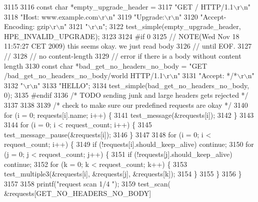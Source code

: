 \begin{DoxyCode}
{{{3115 
3116   \textcolor{keyword}{const} \textcolor{keywordtype}{char} *empty\_upgrade\_header =
3117     \textcolor{stringliteral}{"GET / HTTP/1.1\(\backslash\)r\(\backslash\)n"}
3118     \textcolor{stringliteral}{"Host: www.example.com\(\backslash\)r\(\backslash\)n"}
3119     \textcolor{stringliteral}{"Upgrade:\(\backslash\)r\(\backslash\)n"}
3120     \textcolor{stringliteral}{"Accept-Encoding: gzip\(\backslash\)r\(\backslash\)n"}
3121     \textcolor{stringliteral}{"\(\backslash\)r\(\backslash\)n"};
3122   test_simple(empty\_upgrade\_header, HPE_INVALID_UPGRADE);
3123 
3124 \textcolor{preprocessor}{  #if 0}
3125   \textcolor{comment}{// NOTE(Wed Nov 18 11:57:27 CET 2009) this seems okay. we just read body}
3126   \textcolor{comment}{// until EOF.}
3127   \textcolor{comment}{//}
3128   \textcolor{comment}{// no content-length}
3129   \textcolor{comment}{// error if there is a body without content length}
3130   \textcolor{keyword}{const} \textcolor{keywordtype}{char} *bad\_get\_no\_headers\_no\_body = \textcolor{stringliteral}{"GET /bad\_get\_no\_headers\_no\_body/world HTTP/1.1\(\backslash\)r\(\backslash\)n"}
3131                                            \textcolor{stringliteral}{"Accept: */*\(\backslash\)r\(\backslash\)n"}
3132                                            \textcolor{stringliteral}{"\(\backslash\)r\(\backslash\)n"}
3133                                            \textcolor{stringliteral}{"HELLO"};
3134   test_simple(bad\_get\_no\_headers\_no\_body, 0);
3135 \textcolor{preprocessor}{#endif}
3136   \textcolor{comment}{/* TODO sending junk and large headers gets rejected */}
3137 
3138 
3139   \textcolor{comment}{/* check to make sure our predefined requests are okay */}
3140   \textcolor{keywordflow}{for} (i = 0; requests[i].name; i++) \{
3141     test_message(&requests[i]);
3142   \}
3143 
3144   \textcolor{keywordflow}{for} (i = 0; i < request\_count; i++) \{
3145     test_message_pause(&requests[i]);
3146   \}
3147 
3148   \textcolor{keywordflow}{for} (i = 0; i < request\_count; i++) \{
3149     \textcolor{keywordflow}{if} (!requests[i].should\_keep\_alive) \textcolor{keywordflow}{continue};
3150     \textcolor{keywordflow}{for} (j = 0; j < request\_count; j++) \{
3151       \textcolor{keywordflow}{if} (!requests[j].should\_keep\_alive) \textcolor{keywordflow}{continue};
3152       \textcolor{keywordflow}{for} (k = 0; k < request\_count; k++) \{
3153         test_multiple3(&requests[i], &requests[j], &requests[k]);
3154       \}
3155     \}
3156   \}
3157 
3158   printf(\textcolor{stringliteral}{"request scan 1/4      "});
3159   test_scan( &requests[GET_NO_HEADERS_NO_BODY]
}}}
\end{DoxyCode}
